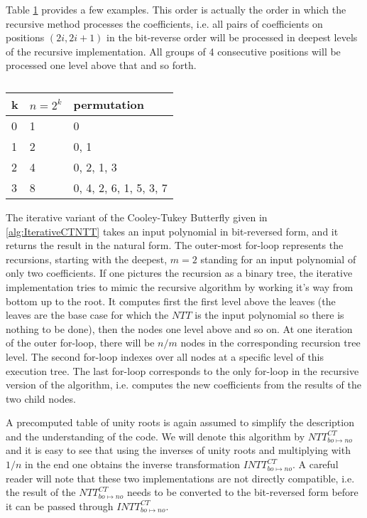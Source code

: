 Table \cref{tab:bit-reversed-order} provides a few examples. This order is actually the order in which the recursive method processes the coefficients, i.e. all pairs of coefficients on positions $(2i, 2i + 1)$ in the bit-reverse order will be processed in deepest levels of the recursive implementation. All groups of 4 consecutive positions will be processed one level above that and so forth. 

\begin{table}[h]
    \caption[]{}\label{tab:bit-reversed-order}
    \centering
    \begin{tabular}{l l l}
      \toprule
        k & $n = 2^k$ & permutation \\
      \midrule
        0 & 1 & 0 \\
        1 & 2 & 0, 1 \\
        2 & 4 & 0, 2, 1, 3 \\
        3 & 8 & 0, 4, 2, 6, 1, 5, 3, 7 \\
      \bottomrule
    \end{tabular}
  \end{table}

The iterative variant of the Cooley-Tukey Butterfly given in \cref{alg:IterativeCTNTT} takes an input polynomial in bit-reversed form, and it returns the result in the natural form. The outer-most for-loop represents the recursions, starting with the deepest, $m = 2$ standing for an input polynomial of only two coefficients. If one pictures the recursion as a binary tree, the iterative implementation tries to mimic the recursive algorithm by working it's way from bottom up to the root. It computes first the first level above the leaves (the leaves are the base case for which the $NTT$ is the input polynomial so there is nothing to be done), then the nodes one level above and so on. At one iteration of the outer for-loop, there will be $n/m$ nodes in the corresponding recursion tree level. The second for-loop indexes over all nodes at a specific level of this execution tree. The last for-loop corresponds to the only for-loop in the recursive version of the algorithm, i.e. computes the new coefficients from the results of the two child nodes. 

A precomputed table of unity roots is again assumed to simplify the description and the understanding of the code. We will denote this algorithm by $NTT^{CT}_{bo \mapsto no}$ and it is easy to see that using the inverses of unity roots and multiplying with $1/n$ in the end one obtains the inverse transformation $INTT^{CT}_{bo \mapsto no}$. A careful reader will note that these two implementations are not directly compatible, i.e. the result of the $NTT^{CT}_{bo \mapsto no}$ needs to be converted to the bit-reversed form before it can be passed through $INTT^{CT}_{bo \mapsto no}$.

